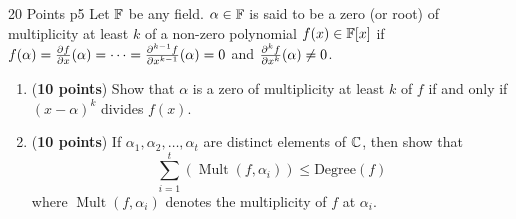 \documentclass[a4paper, 11pt]{article}
\DeclareMathOperator{\mult}{Mult}
\begin{document}
\begin{problem}{%
\hfill 20 Points	}{p5%
	}
Let $\mathbb{F}$ be any field. $\alpha\in\mathbb{F}$ is said to be a zero (or root) of multiplicity at least $k$ of a non-zero polynomial $f(x)\in\mathbb{F}[x]$ if $f(\alpha)=\frac{\partial f}{\partial x}(\alpha)=\cdots=\frac{\partial ^{k-1}f}{\partial x^{k-1}}(\alpha)=0$ and $\frac{\partial ^kf}{\partial x^k}(\alpha)\neq 0$.\begin{enumerate}[label=(\alph*)]
	\item (\textbf{10 points}) Show that $\alpha$ is a zero of multiplicity at least $k$ of $f$ if and only if $(x-\alpha)^k$ divides $f(x)$.
	\item(\textbf{10 points}) If $\alpha_1,\alpha_2,\dots,\alpha_t$ are distinct elements of $\mathbb{C}$, then show that $$\sum\limits_{i=1}^t(\mult(f,\alpha_i))\leq \text{Degree}(f)$$where $\mult(f,\alpha_i)$ denotes the multiplicity of $f$ at $\alpha_i$.
\end{enumerate}
\end{problem}
\end{document}
